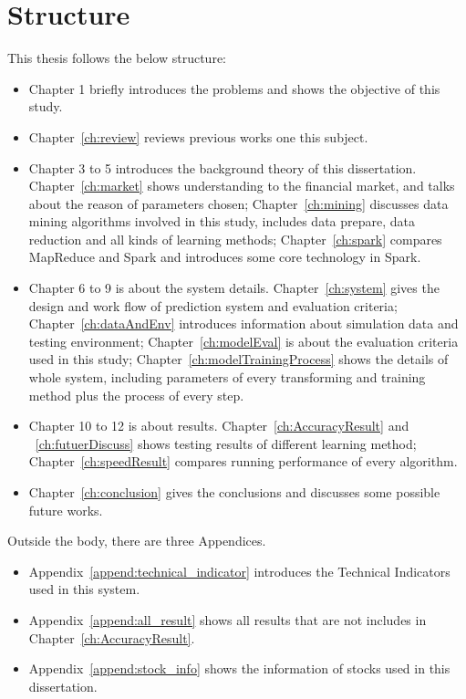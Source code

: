\section{Structure}
This thesis follows the below structure:
\begin{itemize}
	\item Chapter 1 briefly introduces the problems and shows the objective of this study.
	\item Chapter~\ref{ch:review} reviews previous works one this subject.
	\item Chapter 3 to 5 introduces the background theory of this dissertation. Chapter~\ref{ch:market} shows understanding to the financial market, and talks about the reason of parameters chosen; Chapter~\ref{ch:mining} discusses data mining algorithms involved in this study, includes data prepare, data reduction and all kinds of learning methods; Chapter~\ref{ch:spark} compares MapReduce and Spark and introduces some core technology in Spark. 
	\item Chapter 6 to 9 is about the system details. Chapter~\ref{ch:system} gives the design and work flow of prediction system and evaluation criteria; Chapter~\ref{ch:dataAndEnv} introduces information about simulation data and testing environment; Chapter~\ref{ch:modelEval} is about the evaluation criteria used in this study; Chapter~\ref{ch:modelTrainingProcess} shows the details of whole system, including parameters of every transforming and training method plus the process of every step.
	\item Chapter 10 to 12 is about results.  Chapter~\ref{ch:AccuracyResult} and ~\ref{ch:futuerDiscuss} shows testing results of different learning method; Chapter~\ref{ch:speedResult} compares running performance of every algorithm.
	\item Chapter~\ref{ch:conclusion} gives the conclusions and discusses some possible future works.
\end{itemize}

Outside the body, there are three Appendices.
\begin{itemize}
	\item Appendix~\ref{append:technical_indicator} introduces the Technical Indicators used in this system.
	\item Appendix~\ref{append:all_result} shows all results that are not includes in Chapter~\ref{ch:AccuracyResult}.
	\item Appendix~\ref{append:stock_info} shows the information of stocks used in this dissertation.
\end{itemize}